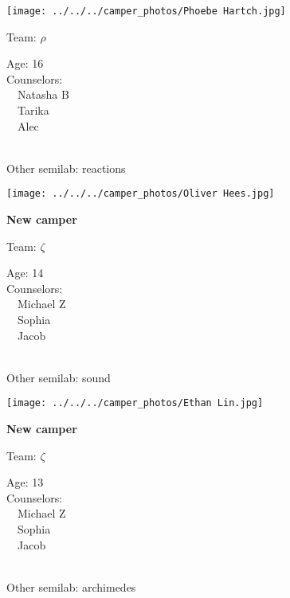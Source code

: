 \documentclass[10pt,letterpaper, landscape]{article}
\begin{document}
\horizontalshiftfornextsticker
\renewcommand{\baselinestretch}{1} \begin{sticker}
\noindent\begin{minipage}{0.5\textwidth}\texttt{[image: ../../../camper\_photos/Phoebe Hartch.jpg]}\end{minipage}\begin{minipage}{0.45\textwidth}
Team: {\Large $\rho$}

Age:        16\\
Counselors: \\\ \ Natasha B\\\ \ Tarika\\\ \ Alec\\
\end{minipage} \\ \vspace{0.07in}
Other semilab: reactions
\end{sticker}
\verticalshiftfornextsticker
\renewcommand{\baselinestretch}{1} \begin{sticker}
\noindent\begin{minipage}{0.5\textwidth}\texttt{[image: ../../../camper\_photos/Oliver Hees.jpg]}\end{minipage}\begin{minipage}{0.45\textwidth}
\textbf{New camper} 

Team: {\Large $\zeta$}

Age:        14\\
Counselors: \\\ \ Michael Z\\\ \ Sophia\\\ \ Jacob\\
\end{minipage} \\ \vspace{0.07in}
Other semilab: sound
\end{sticker}
\horizontalshiftfornextsticker
\renewcommand{\baselinestretch}{1} \begin{sticker}
\noindent\begin{minipage}{0.5\textwidth}\texttt{[image: ../../../camper\_photos/Ethan Lin.jpg]}\end{minipage}\begin{minipage}{0.45\textwidth}
\textbf{New camper} 

Team: {\Large $\zeta$}

Age:        13\\
Counselors: \\\ \ Michael Z\\\ \ Sophia\\\ \ Jacob\\
\end{minipage} \\ \vspace{0.07in}
Other semilab: archimedes
\end{sticker}
\end{document}
